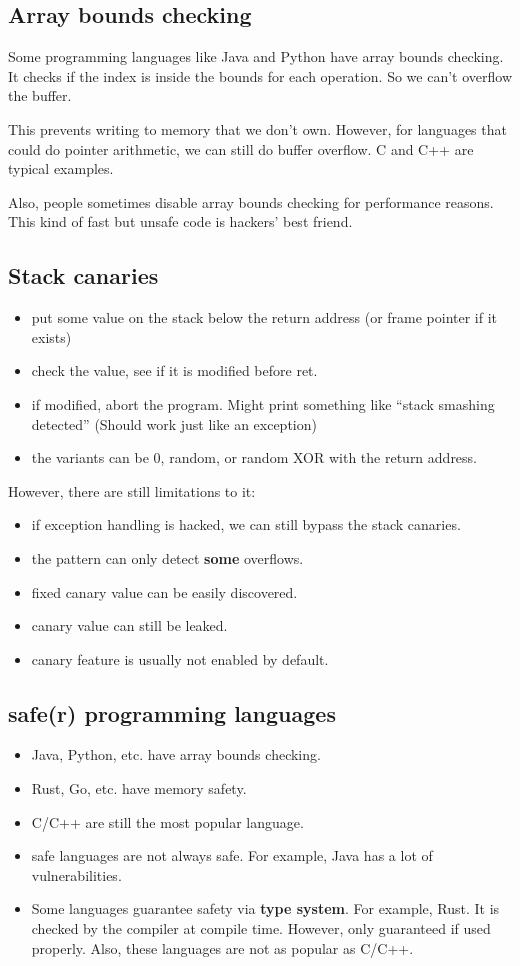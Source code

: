 \documentclass[letterpaper,12pt]{article}
\begin{document}
\subsection{Array bounds checking}
Some programming languages like Java and Python have array bounds checking. It
checks if the index is inside the bounds for each operation. So we can't
overflow the buffer.

This prevents writing to memory that we don't own. However, for languages that
could do pointer arithmetic, we can still do buffer overflow. C and C++ are
typical examples.

Also, people sometimes disable array bounds checking for performance reasons.
This kind of fast but unsafe code is hackers' best friend.

\subsection{Stack canaries}
\begin{itemize}
    \item put some value on the stack below the return address (or frame pointer if it
          exists)
    \item check the value, see if it is modified before ret.
    \item if modified, abort the program. Might print something like ``stack smashing
          detected'' (Should work just like an exception)
    \item the variants can be 0, random, or random XOR with the return address.
\end{itemize}
However, there are still limitations to it:\begin{itemize}
    \item if exception handling is hacked, we can still bypass the stack canaries.
    \item the pattern can only detect \textbf{some} overflows.
    \item fixed canary value can be easily discovered.
    \item canary value can still be leaked.
    \item canary feature is usually not enabled by default.
\end{itemize}
\subsection{safe(r) programming languages}
\begin{itemize}
    \item Java, Python, etc. have array bounds checking.
    \item Rust, Go, etc. have memory safety.
    \item C/C++ are still the most popular language.
    \item safe languages are not always safe. For example, Java has a lot of
          vulnerabilities.
    \item Some languages guarantee safety via \textbf{type system}. For example, Rust. It
          is checked by the compiler at compile time. However, only guaranteed if used
          properly. Also, these languages are not as popular as C/C++.
\end{itemize}
\end{document}
